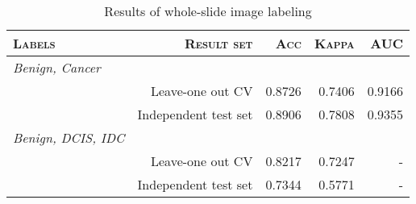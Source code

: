 
    \begin{table}[!t]
    \renewcommand{\arraystretch}{1.1}
    \caption{Results of whole-slide image labeling}
    \label{table_results_stacked}
    \centering
    \begin{tabular}{|lrrrr|}
    \hline
    \textsc{Labels}&\textsc{Result set}&\textsc{Acc}&\textsc{Kappa}&\textsc{AUC}\\
    \hline
    \textit{Benign, Cancer}&&&&\\
    &Leave-one out CV&0.8726&0.7406&0.9166 \\
    &Independent test set&0.8906&0.7808&0.9355 \\
    \textit{Benign, DCIS, IDC}&&&&\\
    &Leave-one out CV&0.8217&0.7247&- \\
    &Independent test set&0.7344&0.5771&- \\
    \hline

    \end{tabular}
    \end{table}

    